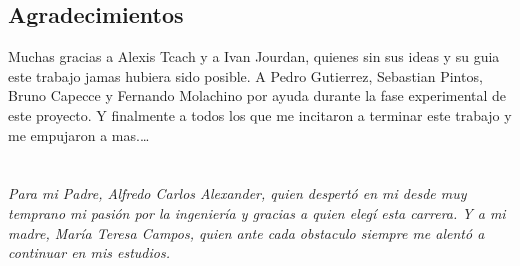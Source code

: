 \documentclass[notitlepage]{report}
\renewcommand\headrulewidth{0pt}  %
\begin{document}
\section*{Agradecimientos}
        Muchas gracias a Alexis Tcach y a Ivan Jourdan, quienes sin sus ideas y su guia este trabajo jamas hubiera sido posible. A Pedro Gutierrez, Sebastian Pintos, Bruno Capecce y Fernando Molachino por ayuda durante la fase experimental de este proyecto. Y finalmente a todos los que me incitaron a terminar este trabajo y me empujaron a mas.\ldots
\newpage

\printacronyms[include-classes=abbrev,name={\Huge Lista de abreviaciones \\}]   %
\cleardoublepage
\printacronyms[include-classes=nomencl,name={\Huge  Glosario \\}]  %
\listoffigures
{}
\listoftables
{}
\renewcommand\headrulewidth{1pt} %
\tableofcontents
{}

\clearpage

\chapter*{}
\vspace*{0.2\textheight}

\begin{center}{\Large\slshape Para mi Padre, Alfredo Carlos Alexander, quien despertó en mi desde muy temprano mi pasión por la ingeniería y gracias a quien elegí esta carrera. Y a mi madre, María Teresa Campos, quien ante cada obstaculo siempre me alentó a continuar en mis estudios.}\end{center}
\end{document}
